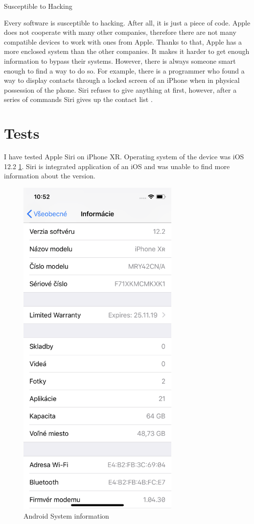 \documentclass[
  digital, %
  oneside, %
  table,   %
  lof,     %
  lot,     %
]{fithesis3}
\begin{document}
\begin{compactitem}
  \item Susceptible to Hacking
  
Every software is susceptible to hacking. After all, it is just a piece of code. Apple does not cooperate with many other companies, therefore there are not many compatible devices to work with ones from Apple. Thanks to that, Apple has a more enclosed system than the other companies. It makes it harder to get enough information to bypass their systems. However, there is always someone smart enough to find a way to do so. For example, there is a programmer who found a way to display contacts through a locked screen of an iPhone when in physical possession of the phone. Siri refuses to give anything at first, however, after a series of commands Siri gives up the contact list \parencite{siri_hacking}.

\end{compactitem}

\section{Tests}

I have tested Apple Siri on iPhone XR. Operating system of the device was iOS 12.2 \ref{fig:ios_info}. Siri is integrated application of an iOS and was unable to find more information about the version.

\begin{figure}[H]
  \begin{center}
    \includegraphics[width=8cm]{pictures/ios_info.PNG}
  \end{center}
  \caption{Android System information}
  \label{fig:ios_info}
\end{figure}
\end{document}
